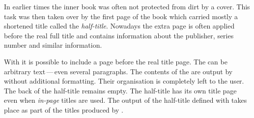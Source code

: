 \begin{Declaration}
\end{Declaration}%
\begin{Explain}%
  In earlier times the inner book was often not protected from dirt by a cover.
  This task was then taken over by the first page of the book which
  carried mostly a shortened title called the \emph{half-title}.
  Nowadays the extra page is often applied before the real full title
  and contains information about the publisher, series number and similar
  information.
\end{Explain}
With {\KOMAScript} it is possible to include a page before the real
title page.  The  can be arbitrary text\,---\,even
several paragraphs. The contents of the  are output
by {\KOMAScript} without additional formatting. Their organisation is
completely left to the user. The back of the half-title remains empty.
The half-title has its own title page even when \emph{in-page} titles
are used. The output of the half-title defined with 
takes place as part of the titles produced by .

